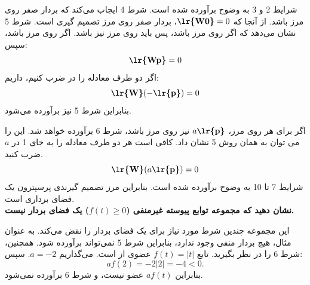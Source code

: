 \documentclass[a4paper,12pt]{report}
\begin{document}
    شرایط 2 و 3 به وضوح برآورده شده است. شرط 4 ایجاب می‌کند که بردار صفر روی مرز باشد. از آنجا که
    $ \textbf{\lr{W0}} = 0 $،
     بردار صفر روی مرز تصمیم گیری است. شرط 5 نشان می‌دهد که اگر \textbf{} روی مرز \textbf{} باشد، پس باید روی مرز نیز باشد. اگر \textbf{} روی مرز باشد، سپس:
     $$
     \textbf{\lr{Wp}}=0
     $$
     اگر دو طرف معادله را در  ضرب کنیم، داریم:
     $$
     \textbf{\lr{W}}(-\textbf{\lr{p}})=0
     $$
     بنابراین شرط 5 نیز برآورده می‌شود.
     
     اگر برای هر \textbf{} روی مرز،
     $ a\textbf{\lr{p}} $
      نیز روی مرز باشد، شرط 6 برآورده خواهد شد. این را می توان به همان روش 5 نشان داد. کافی است هر دو طرف معادله را به جای 1 در $ a $ ضرب کنید.
      $$
      \textbf{\lr{W}}(a\textbf{\lr{p}})=0
      $$
      شرایط 7 تا 10 به وضوح برآورده شده است. بنابراین مرز تصمیم گیرندی پرسپترون یک فضای برداری است.\\
      
      \hspace{-2cm}\textbf{}
      \textbf
      {
      	نشان دهید که مجموعه  توابع پیوسته غیرمنفی ($ f(t) \geq 0 $) یک فضای بردار نیست.
      }
      
      این مجموعه چندین شرط مورد نیاز برای یک فضای بردار را نقض می‌کند. به عنوان مثال، هیچ بردار منفی وجود ندارد، بنابراین شرط 5 نمی‌تواند برآورده شود. همچنین، شرط 6 را در نظر بگیرید. تابع $ f(t)=|t| $ عضوی از  است. می‌گذاریم $ a=-2 $. سپس:
      $$
      af(2)=-2|2|=-4 < 0.
      $$
      بنابراین $ af(t) $ عضو  نیست، و شرط 6 برآورده نمی‌شود.\\
      
\end{document}
